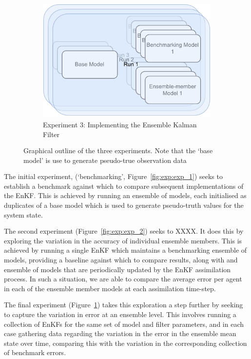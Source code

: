 \documentclass{article}
\begin{document}
\begin{figure}[htp]
    \begin{subfigure}[htb]{0.50\textwidth}
        \centering
        \includegraphics[width=\textwidth]{figures/exp_3}
        \caption{Experiment 3: Implementing the Ensemble Kalman
        Filter}\label{fig:exp:exp_3}
    \end{subfigure}
    \caption{Graphical outline of the three experiments. Note that the `base model' is use to generate pseudo-true observation data }\label{fig:exp}
\end{figure}

The initial experiment, (`benchmarking', Figure~\ref{fig:exp:exp_1}) seeks to establish a benchmark against which to compare subsequent implementations of the EnKF. 
This is achieved by running an ensemble of models, each initialised as duplicates of a base model which is used to generate pseudo-truth values for the system state.

The second experiment (Figure~\ref{fig:exp:exp_2}) seeks to XXXX. It does this by exploring the variation in the accuracy of individual ensemble members. 
This is achieved by running a single EnKF which maintains a benchmarking ensemble of models, providing a baseline against which to compare results, along with and ensemble of models that are periodically updated by the EnKF assimilation process. In such a situation, we are able to compare the average error per agent in each of the ensemble member models at each assimilation time-step.

The final experiment (Figure~\ref{fig:exp:exp_3}) takes this exploration a step further by seeking to capture the variation in error at an ensemble level. This involves running a collection of EnKFs for the same set of model and filter parameters, and in each case gathering data regarding the variation in the error in the ensemble mean state over time, comparing this with
the variation in the corresponding collection of benchmark errors.
\end{document}
